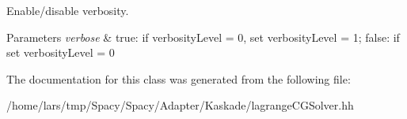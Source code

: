 Enable/disable verbosity. 


\begin{DoxyParams}{Parameters}
{\em verbose} & true\+: if verbosity\+Level = 0, set verbosity\+Level = 1; false\+: if set verbosity\+Level = 0 \\
\hline
\end{DoxyParams}


The documentation for this class was generated from the following file\+:\begin{DoxyCompactItemize}
\item 
/home/lars/tmp/\+Spacy/\+Spacy/\+Adapter/\+Kaskade/lagrange\+C\+G\+Solver.\+hh\end{DoxyCompactItemize}
